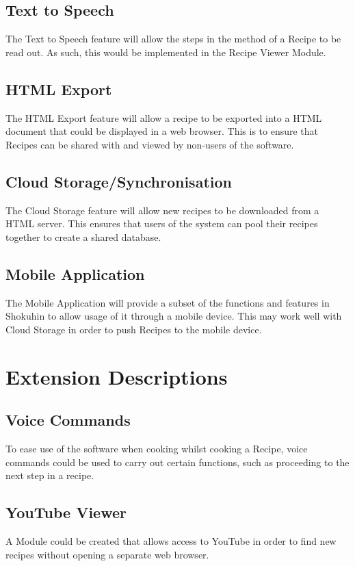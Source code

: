 \documentclass[a4paper, 12pt]{article}
\begin{document}
\subsection{Text to Speech}
The Text to Speech feature will allow the steps in the method of a Recipe to be read out. As such, this would be implemented in the Recipe Viewer Module.

\subsection{HTML Export}
The HTML Export feature will allow a recipe to be exported into a HTML document that could be displayed in a web browser. This is to ensure that Recipes can be shared with and viewed by non-users of the software.

\subsection{Cloud Storage/Synchronisation}
The Cloud Storage feature will allow new recipes to be downloaded from a HTML server. This ensures that users of the system can pool their recipes together to create a shared database.

\subsection{Mobile Application}
The Mobile Application will provide a subset of the functions and features in Shokuhin to allow usage of it through a mobile device. This may work well with Cloud Storage in order to push Recipes to the mobile device.

\newpage
\section{Extension Descriptions}
\subsection{Voice Commands}
To ease use of the software when cooking whilst cooking a Recipe, voice commands could be used to carry out certain functions, such as proceeding to the next step in a recipe.

\subsection{YouTube Viewer}
A Module could be created that allows access to YouTube in order to find new recipes without opening a separate web browser.
\end{document}
